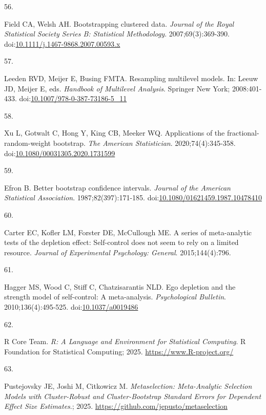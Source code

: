 \documentclass[
  american,
  man, donotrepeattitle,floatsintext]{apa7}
\newlength{\cslhangindent}
\newlength{\csllabelwidth}
\newenvironment{CSLReferences}[2] %
 {\begin{list}{}{%
  \setlength{\itemindent}{0pt}
  \setlength{\leftmargin}{0pt}
  \setlength{\parsep}{0pt}
  \ifodd #1
   \setlength{\leftmargin}{\cslhangindent}
   \setlength{\itemindent}{-1\cslhangindent}
  \fi
  \setlength{\itemsep}{#2\baselineskip}}}
 {\end{list}}
\newcommand{\CSLLeftMargin}[1]{\parbox[t]{\csllabelwidth}{\strut#1\strut}}
\newcommand{\CSLRightInline}[1]{\parbox[t]{\linewidth - \csllabelwidth}{\strut#1\strut}}
\begin{document}
\begin{CSLReferences}{0}{1}
\CSLLeftMargin{56. }%
\CSLRightInline{Field CA, Welsh AH. Bootstrapping clustered data. \emph{Journal of the Royal Statistical Society Series B: Statistical Methodology}. 2007;69(3):369-390. doi:\href{https://doi.org/10.1111/j.1467-9868.2007.00593.x}{10.1111/j.1467-9868.2007.00593.x}}

\CSLLeftMargin{57. }%
\CSLRightInline{Leeden RVD, Meijer E, Busing FMTA. Resampling multilevel models. In: Leeuw JD, Meijer E, eds. \emph{Handbook of {Multilevel} {Analysis}}. Springer New York; 2008:401-433. doi:\href{https://doi.org/10.1007/978-0-387-73186-5_11}{10.1007/978-0-387-73186-5\_11}}

\CSLLeftMargin{58. }%
\CSLRightInline{Xu L, Gotwalt C, Hong Y, King CB, Meeker WQ. Applications of the fractional-random-weight bootstrap. \emph{The American Statistician}. 2020;74(4):345-358. doi:\href{https://doi.org/10.1080/00031305.2020.1731599}{10.1080/00031305.2020.1731599}}

\CSLLeftMargin{59. }%
\CSLRightInline{Efron B. Better bootstrap confidence intervals. \emph{Journal of the American Statistical Association}. 1987;82(397):171-185. doi:\href{https://doi.org/10.1080/01621459.1987.10478410}{10.1080/01621459.1987.10478410}}

\CSLLeftMargin{60. }%
\CSLRightInline{Carter EC, Kofler LM, Forster DE, McCullough ME. A series of meta-analytic tests of the depletion effect: Self-control does not seem to rely on a limited resource. \emph{Journal of Experimental Psychology: General}. 2015;144(4):796.}

\CSLLeftMargin{61. }%
\CSLRightInline{Hagger MS, Wood C, Stiff C, Chatzisarantis NLD. Ego depletion and the strength model of self-control: {A} meta-analysis. \emph{Psychological Bulletin}. 2010;136(4):495-525. doi:\href{https://doi.org/10.1037/a0019486}{10.1037/a0019486}}

\CSLLeftMargin{62. }%
\CSLRightInline{R Core Team. \emph{R: A Language and Environment for Statistical Computing}. R Foundation for Statistical Computing; 2025. \url{https://www.R-project.org/}}

\CSLLeftMargin{63. }%
\CSLRightInline{Pustejovsky JE, Joshi M, Citkowicz M. \emph{Metaselection: Meta-Analytic Selection Models with Cluster-Robust and Cluster-Bootstrap Standard Errors for Dependent Effect Size Estimates}.; 2025. \url{https://github.com/jepusto/metaselection}}


\end{CSLReferences}
\end{document}
